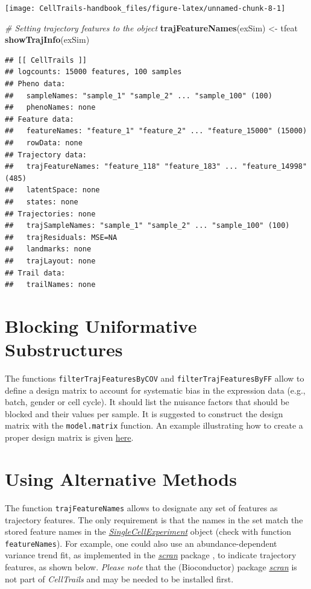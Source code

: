 \documentclass[]{book}
\newenvironment{Shaded}{\begin{snugshade}}{\end{snugshade}}
\newcommand{\KeywordTok}[1]{\textcolor[rgb]{0.13,0.29,0.53}{\textbf{#1}}}
\newcommand{\StringTok}[1]{\textcolor[rgb]{0.31,0.60,0.02}{#1}}
\newcommand{\CommentTok}[1]{\textcolor[rgb]{0.56,0.35,0.01}{\textit{#1}}}
\newcommand{\NormalTok}[1]{#1}
\theoremstyle{definition}
\theoremstyle{definition}
\theoremstyle{definition}
\theoremstyle{remark}
\begin{document}
\texttt{[image: CellTrails-handbook\_files/figure-latex/unnamed-chunk-8-1]}

\begin{Shaded}
\begin{Highlighting}[]
\CommentTok{# Setting trajectory features to the object}
\KeywordTok{trajFeatureNames}\NormalTok{(exSim) <-}\StringTok{ }\NormalTok{tfeat}
\KeywordTok{showTrajInfo}\NormalTok{(exSim)}
\end{Highlighting}
\end{Shaded}

\begin{verbatim}
## [[ CellTrails ]] 
## logcounts: 15000 features, 100 samples
## Pheno data: 
##   sampleNames: "sample_1" "sample_2" ... "sample_100" (100)
##   phenoNames: none
## Feature data: 
##   featureNames: "feature_1" "feature_2" ... "feature_15000" (15000)
##   rowData: none
## Trajectory data: 
##   trajFeatureNames: "feature_118" "feature_183" ... "feature_14998" (485)
##   latentSpace: none
##   states: none
## Trajectories: none
##   trajSampleNames: "sample_1" "sample_2" ... "sample_100" (100)
##   trajResiduals: MSE=NA
##   landmarks: none
##   trajLayout: none
## Trail data: 
##   trailNames: none
\end{verbatim}

\section{Blocking Uniformative
Substructures}\label{blocking-uniformative-substructures}

The functions \texttt{filterTrajFeaturesByCOV} and
\texttt{filterTrajFeaturesByFF} allow to define a design matrix to
account for systematic bias in the expression data (e.g., batch, gender
or cell cycle). It should list the nuisance factors that should be
blocked and their values per sample. It is suggested to construct the
design matrix with the \texttt{model.matrix} function. An example
illustrating how to create a proper design matrix is given
\protect\hyperlink{S-blockSubstructures}{here}.

\section{Using Alternative Methods}\label{using-alternative-methods}

The function \texttt{trajFeatureNames} allows to designate any set of
features as trajectory features. The only requirement is that the names
in the set match the stored feature names in the
\emph{\href{http://bioconductor.org/packages/SingleCellExperiment}{SingleCellExperiment}}
object (check with function \texttt{featureNames}). For example, one
could also use an abundance-dependent variance trend fit, as implemented
in the \emph{\href{http://bioconductor.org/packages/scran}{scran}}
package \citep{scran}, to indicate trajectory features, as shown below.
\emph{Please note} that the (Bioconductor) package
\emph{\href{http://bioconductor.org/packages/scran}{scran}} is not part
of \emph{CellTrails} and may be needed to be installed first.
\end{document}
